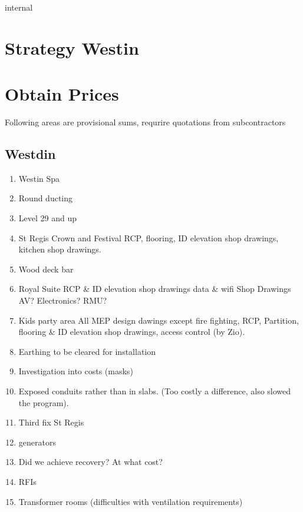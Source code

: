 internal

\section{Strategy Westin}

\section{Obtain Prices}

Following areas are provisional sums, requrire quotations from subcontractors

\subsection{Westdin}

\begin{enumerate}
\item Westin Spa
\item Round ducting
\item Level 29 and up

\item St Regis Crown and Festival RCP, flooring, ID elevation shop drawings, kitchen shop drawings.
\item Wood deck bar  
\item Royal Suite RCP \& ID elevation shop drawings data \& wifi Shop Drawings AV? Electronics? RMU?
\item Kids party area All MEP design dawings except fire fighting, RCP, Partition, flooring \& ID elevation shop drawings, access control (by Zio).

\item Earthing to be cleared for installation
\item Investigation into costs (masks)
\item Exposed conduits rather than in slabs. (Too costly a difference, also slowed the program).

\item Third fix  St Regis

\item generators

\item Did we achieve recovery? At what cost?

\item RFIs

\item Transformer rooms (difficulties with ventilation requirements)


\end{enumerate}
